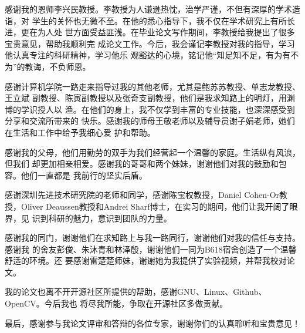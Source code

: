 \begin{ack}

  感谢我的恩师李兴民教授。李教授为人谦逊热忱，治学严谨，不但有深厚的学术造诣，对
  学生的关怀也无微不至。在他的悉心指导下，我不仅在学术研究上有所长进，更在为人处
  世方面受益匪浅。在毕业论文写作期间，李教授给我提出了很多宝贵意见，帮助我顺利完
  成论文工作。今后，我会谨记李教授对我的指导，学习他认真专注的科研精神，学习他乐
  观豁达的心境，铭记他“知足知不足，有为有不为”的教诲，不负师恩。

  感谢计算机学院一路走来指导过我的其他老师，尤其是鲍苏苏教授、单志龙教授、王立斌
  副教授、陈寅副教授以及张奇支副教授，他们是我求知路上的明灯，用渊博的学识授人以
  渔。在他们的身上，我不仅学到丰富的专业技能，也深深感受到分享和交流所带来的
  快乐。感谢我的师母王敬老师以及辅导员谢子娟老师，她们在生活和工作中给予我细心爱
  护和帮助。

  感谢我的父母，他们用勤劳的双手为我们经营起一个温馨的家庭。生活纵有风浪，但我们
  却更加相亲相爱。感谢我的哥哥和两个妹妹，谢谢他们对我的鼓励和包容。他们一直都是
  我前行的坚实后盾。
  
  感谢深圳先进技术研究院的老师和同学，感谢陈宝权教授，Daniel Cohen-Or教
  授，Oliver Deaussen教授和Andrei Sharf博士，在实习的期间，他们让我开阔了眼界，见
  识到科研的魅力，意识到团队的力量。

  感谢我的同门，谢谢他们在求知路上与我一路同行，谢谢他们对我的信任与支持。感谢我
  的舍友彭俊、朱沐青和林泽殷，谢谢他们一同为B618宿舍创造了一个温馨舒适的环境。还
  要感谢雷楚楚师妹，谢谢她为我提供了实验视频，并帮我校对论文。

  我的论文也离不开开源社区所提供的帮助，感谢GNU、Linux、Github、OpenCV。今后我也
  将尽我所能，争取在开源社区多做贡献。

  最后，感谢参与我论文评审和答辩的各位专家，谢谢你们的认真聆听和宝贵意见！
  
\end{ack}

